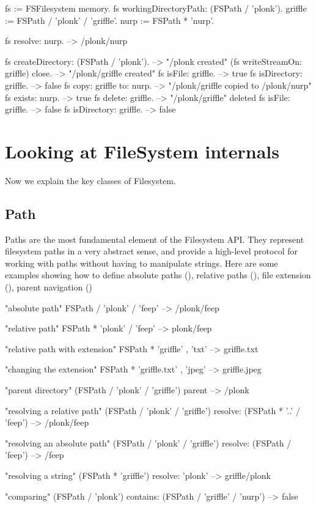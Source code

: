 \documentclass[a4paper,10pt,twoside]{book}
\begin{document}
\begin{code}{}
fs := FSFilesystem memory.
fs workingDirectoryPath: (FSPath / 'plonk').
griffle := FSPath / 'plonk' / 'griffle'.
nurp := FSPath * 'nurp'.
    
fs resolve: nurp.            --> /plonk/nurp
    
fs createDirectory: (FSPath / 'plonk').  --> "/plonk created"
(fs writeStreamOn: griffle) close.  --> "/plonk/griffle created"
fs isFile: griffle.         --> true
fs isDirectory: griffle.         --> false
fs copy: griffle to: nurp.       --> "/plonk/griffle copied to /plonk/nurp"
fs exists: nurp.             --> true
fs delete: griffle.          --> "/plonk/griffle" deleted
fs isFile: griffle.          --> false
fs isDirectory: griffle.         --> false
\end{code}
	



\section{Looking at FileSystem internals}
Now we explain the key classes of Filesystem. 






\subsection{Path}
Paths are the most fundamental element of the Filesystem API. They represent filesystem paths in a very abstract sense, and provide a high-level protocol for working with paths without having to manipulate strings. Here are some examples showing how to 
define absolute paths (), relative paths (), file extension (), parent navigation ()

\begin{code}{}
"absolute path"
FSPath / 'plonk' / 'feep'       --> /plonk/feep
    
"relative path"
FSPath * 'plonk' / 'feep'       --> plonk/feep

"relative path with extension"
FSPath * 'griffle' , 'txt'      --> griffle.txt
    
"changing the extension"
FSPath * 'griffle.txt' , 'jpeg'     --> griffle.jpeg
    
"parent directory"
(FSPath / 'plonk' / 'griffle') parent   --> /plonk
    
"resolving a relative path"
(FSPath / 'plonk' / 'griffle') resolve: (FSPath * '..' / 'feep')
                   --> /plonk/feep
    
"resolving an absolute path"
(FSPath / 'plonk' / 'griffle') resolve: (FSPath / 'feep')
                   --> /feep
                                           
"resolving a string"
(FSPath * 'griffle') resolve: 'plonk'   --> griffle/plonk
                        
"comparing"
(FSPath / 'plonk') contains: (FSPath / 'griffle' / 'nurp')
                     --> false
\end{code}
\end{document}
